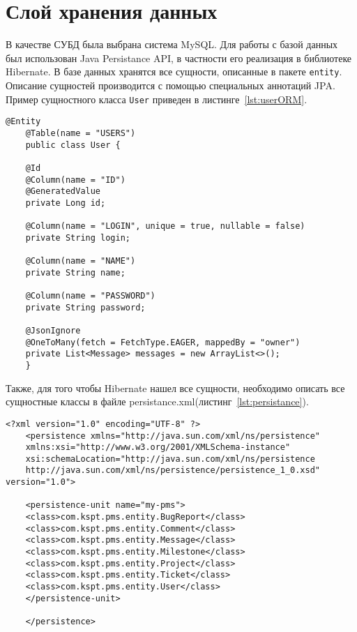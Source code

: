 \section{Слой хранения данных}
	В качестве СУБД была выбрана система MySQL. Для работы с базой данных был использован Java Persistance API, в частности его реализация в библиотеке Hibernate. В базе данных хранятся все сущности, описанные в пакете \texttt{entity}. Описание сущностей производится с помощью специальных аннотаций JPA. Пример сущностного класса \texttt{User} приведен в листинге~\ref{lst:userORM}.
	\begin{lstlisting}[style=crs_java, label={lst:userORM}, caption={Описание сущности}]
	@Entity
	@Table(name = "USERS")
	public class User {
	
	@Id
	@Column(name = "ID")
	@GeneratedValue
	private Long id;
	
	@Column(name = "LOGIN", unique = true, nullable = false)
	private String login;
	
	@Column(name = "NAME")
	private String name;
	
	@Column(name = "PASSWORD")
	private String password;
	
	@JsonIgnore
	@OneToMany(fetch = FetchType.EAGER, mappedBy = "owner")
	private List<Message> messages = new ArrayList<>();
	}
	\end{lstlisting}
	
	Также, для того чтобы Hibernate нашел все сущности, необходимо описать все сущностные классы в файле persistance.xml(листинг~\ref{lst:persistance}).
	\begin{lstlisting}[style=crs_xml, label={lst:persistance}, caption={Файл persistance.xml}]
	<?xml version="1.0" encoding="UTF-8" ?>
	<persistence xmlns="http://java.sun.com/xml/ns/persistence"
	xmlns:xsi="http://www.w3.org/2001/XMLSchema-instance"
	xsi:schemaLocation="http://java.sun.com/xml/ns/persistence
	http://java.sun.com/xml/ns/persistence/persistence_1_0.xsd" version="1.0">
	
	<persistence-unit name="my-pms">
	<class>com.kspt.pms.entity.BugReport</class>
	<class>com.kspt.pms.entity.Comment</class>
	<class>com.kspt.pms.entity.Message</class>
	<class>com.kspt.pms.entity.Milestone</class>
	<class>com.kspt.pms.entity.Project</class>
	<class>com.kspt.pms.entity.Ticket</class>
	<class>com.kspt.pms.entity.User</class>
	</persistence-unit>
	
	</persistence>
	\end{lstlisting}
	
